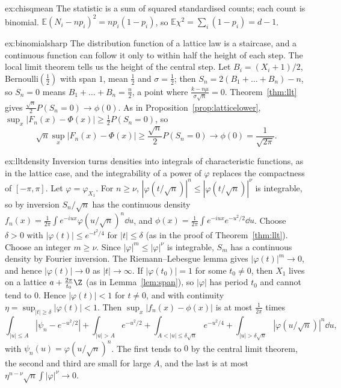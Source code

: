 \begin{solution}{ex:chisqmean}
\idea The statistic is a sum of squared standardised counts; each count is binomial.
\writeup $\mathbb E(N_i-np_i)^2=np_i(1-p_i)$, so $\mathbb E\chi^2=\sum_i(1-p_i)=d-1$.
\end{solution}

\begin{solution}{ex:binomialsharp}
\idea The distribution function of a lattice law is a staircase, and a continuous function can follow it only to within half the height of each step.
The local limit theorem tells us the height of the central step.
\writeup Let $B_i=(X_i+1)/2$, Bernoulli$(\frac12)$ with span $1$, mean $\frac12$ and $\sigma=\frac12$; then $S_n=2(B_1+\dots+B_n)-n$, so $S_n=0$ means
$B_1+\dots+B_n=\frac n2$, a point where $\frac{k-n\mu}{\sigma\sqrt n}=0$. Theorem~\ref{thm:llt} gives $\frac{\sqrt n}2P(S_n=0)\to\phi(0)$. As in
Proposition~\ref{prop:latticelower}, $\sup_x|F_n(x)-\Phi(x)|\ge\frac12P(S_n=0)$, so
\[
\sqrt n\sup_x|F_n(x)-\Phi(x)|\ge\frac{\sqrt n}2P(S_n=0)\to\phi(0)=\frac1{\sqrt{2\pi}}.
\]
\end{solution}

\begin{solution}{ex:lltdensity}
\idea Inversion turns densities into integrals of characteristic functions, as in the lattice case, and the integrability of a power of $\varphi$
replaces the compactness of $[-\pi,\pi]$.
\writeup Let $\varphi=\varphi_{X_1}$. For $n\ge\nu$, $|\varphi(t/\sqrt n)|^n\le|\varphi(t/\sqrt n)|^\nu$ is integrable, so by inversion $S_n/\sqrt n$ has the continuous
density $f_n(x)=\frac1{2\pi}\int e^{-iux}\varphi(u/\sqrt n)^n\dd u$, and $\phi(x)=\frac1{2\pi}\int e^{-iux}e^{-u^2/2}\dd u$. Choose $\delta>0$ with
$|\varphi(t)|\le e^{-t^2/4}$ for $|t|\le\delta$ (as in the proof of Theorem~\ref{thm:llt}). Choose an integer $m\ge\nu$. Since $|\varphi|^m\le|\varphi|^\nu$ is integrable, $S_m$ has a continuous density by Fourier inversion. The Riemann--Lebesgue lemma gives $|\varphi(t)|^m\to0$, and hence $|\varphi(t)|\to0$ as $|t|\to\infty$. If
$|\varphi(t_0)|=1$ for some $t_0\ne0$, then $X_1$ lives on a lattice $a+\frac{2\pi}{t_0}\Z$ (as in Lemma~\ref{lem:span}), so $|\varphi|$ has period $t_0$ and
cannot tend to $0$. Hence $|\varphi(t)|<1$ for $t\ne0$, and with continuity $\eta=\sup_{|t|\ge\delta}|\varphi(t)|<1$.
Then $\sup_x|f_n(x)-\phi(x)|$ is at most $\frac1{2\pi}$ times
\[
\int_{|u|\le A}|\psi_n-e^{-u^2/2}|+\int_{|u|>A}e^{-u^2/2}+\int_{A<|u|\le\delta\sqrt n}e^{-u^2/4}+\int_{|u|>\delta\sqrt n}|\varphi(u/\sqrt n)|^n\dd u,
\]
with $\psi_n(u)=\varphi(u/\sqrt n)^n$. The first tends to $0$ by the central limit theorem, the second and third are small for large $A$, and the last is at
most $\eta^{n-\nu}\sqrt n\int|\varphi|^\nu\to0$.
\end{solution}

